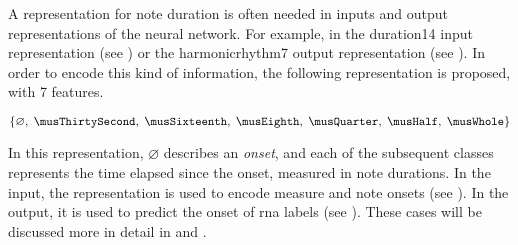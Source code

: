 
A representation for note duration is often needed in inputs
and output representations of the neural network. For
example, in the \gls{duration14} input representation (see
) or the \gls{harmonicrhythm7} output
representation (see ). In
order to encode this kind of information, the following
representation is proposed, with 7 features.

\begin{equation}
    \{\varnothing,\; \musThirtySecond,\; \musSixteenth,\; \musEighth,\; 
    \musQuarter,\; \musHalf,\; \musWhole \}
\end{equation}

In this representation, $\varnothing$ describes an
\emph{onset}, and each of the subsequent classes represents
the time elapsed since the onset, measured in note
durations. In the input, the representation is used to
encode measure and note onsets (see
). In the output, it is
used to predict the onset of \gls{rna} labels (see
). These cases will be
discussed more in detail in  and
.
